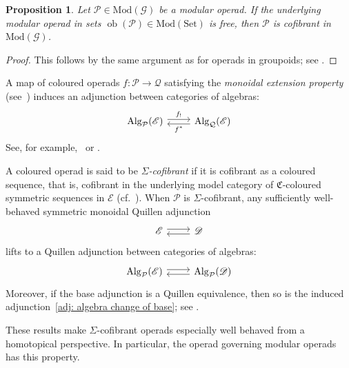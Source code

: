 \documentclass{amsart}
\newcommand{\bE}{\mathscr{E}}
\newcommand{\Set}{\mathrm{Set}}
\newcommand{\Grpd}{\mathscr{G}}
\newcommand{\Mod}{\mathrm{Mod}}
\newcommand{\ob}{\operatorname{ob}}
\newcommand{\Alg}{\operatorname{Alg}}
\newtheorem{prop}[theorem]{Proposition}%
\theoremstyle{definition}
\numberwithin{equation}{section}
\begin{document}
\begin{prop}\label{prop: cofibrant modular operad}
Let $\mathcal{P}\in\Mod(\Grpd)$ be a modular operad. If the underlying modular operad in sets $\ob(\mathcal{P})\in\Mod(\Set)$ is free, then $\mathcal{P}$ is cofibrant in $\Mod(\Grpd)$.
\end{prop}

\begin{proof}
This follows by the same argument as for operads in groupoids; see \cite[Proposition~6.8]{Horel_profinite_groupoids}.
\end{proof}

\medskip 

A map of coloured operads $f:\mathcal{P}\longrightarrow \mathcal{Q}$ satisfying the \emph{monoidal extension property} (see~\cite[Definition~1.1]{dch_coextension}) induces an adjunction between categories of algebras:
\begin{equation}\label{adj: algebras over different operads}
\begin{tikzcd}
\Alg_{\mathcal{P}}(\bE) \arrow[r, shift left=1, "f_!"] &
\Alg_{\mathcal{Q}}(\bE) \arrow[l, shift left=1, "f^*"]
\end{tikzcd}
\end{equation}
See, for example,~\cite{bm_resolutions} or \cite[Remark~2.26]{dch_coextension}.

A coloured operad is said to be \emph{$\Sigma$-cofibrant} if it is cofibrant as a coloured sequence, that is, cofibrant in the underlying model category of $\mathfrak{C}$-coloured symmetric sequences in $\bE$ (cf.~\cite[Definition~4.7]{hry_shrink}). When $\mathcal{P}$ is $\Sigma$-cofibrant, any sufficiently well-behaved symmetric monoidal Quillen adjunction
\[
\begin{tikzcd}
\bE \arrow[r, shift left=1] & \mathscr{D} \arrow[l, shift left=1]
\end{tikzcd}
\]
lifts to a Quillen adjunction between categories of algebras:
\begin{equation}\label{adj: algebra change of base}
\begin{tikzcd}
\Alg_{\mathcal{P}}(\bE) \arrow[r, shift left=1] &
\Alg_{\mathcal{P}}(\mathscr{D}) \arrow[l, shift left=1]
\end{tikzcd}
\end{equation}
Moreover, if the base adjunction is a Quillen equivalence, then so is the induced adjunction~\eqref{adj: algebra change of base}; see \cite[Theorem~5.8]{hry_shrink}.

These results make $\Sigma$-cofibrant operads especially well behaved from a homotopical perspective. In particular, the operad governing modular operads has this property.
\end{document}
